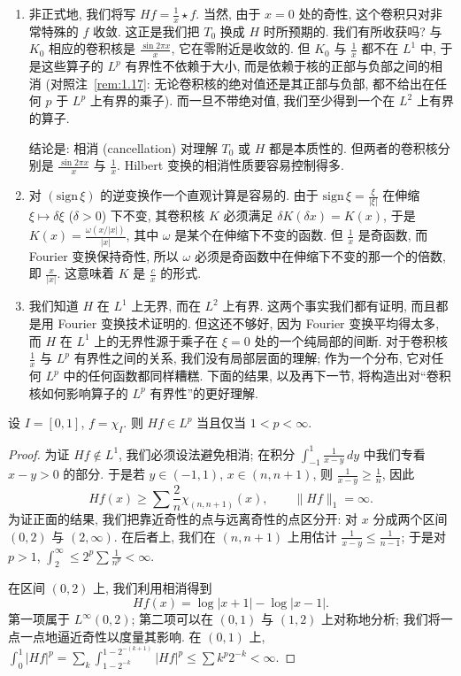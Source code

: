 \begin{remark}\label{rem:2.15}
\begin{enumerate}[label=\alph*)]
\item 非正式地, 我们将写 $Hf=\frac{1}{x}\star f$. 当然, 由于 $x=0$ 处的奇性, 这个卷积只对非常特殊的 $f$ 收敛. 这正是我们把 $T_0$ 换成 $H$ 时所预期的. 我们有所收获吗? 与 $K_0$ 相应的卷积核是 $\frac{\sin 2\pi x}{x}$, 它在零附近是收敛的. 但 $K_0$ 与 $\frac{1}{x}$ 都不在 $L^1$ 中, 于是这些算子的 $L^p$ 有界性不依赖于大小, 而是依赖于核的正部与负部之间的相消 (对照注~\ref{rem:1.17}: 无论卷积核的绝对值还是其正部与负部, 都不给出在任何 $p$ 于 $L^p$ 上有界的乘子). 而一旦不带绝对值, 我们至少得到一个在 $L^2$ 上有界的算子.

结论是: 相消 (cancellation) 对理解 $T_0$ 或 $H$ 都是本质性的. 但两者的卷积核分别是 $\frac{\sin 2\pi x}{x}$ 与 $\frac{1}{x}$. Hilbert 变换的相消性质要容易控制得多.
\item 对 $(\mathrm{sign}\,\xi)$ 的逆变换作一个直观计算是容易的. 由于 $\mathrm{sign}\,\xi=\frac{\xi}{|\xi|}$ 在伸缩 $\xi\mapsto\delta\xi$ ($\delta>0$) 下不变, 其卷积核 $K$ 必须满足 $\delta K(\delta x)=K(x)$, 于是 $K(x)=\frac{\omega(x/|x|)}{|x|}$, 其中 $\omega$ 是某个在伸缩下不变的函数. 但 $\frac{1}{x}$ 是奇函数, 而 Fourier 变换保持奇性, 所以 $\omega$ 必须是奇函数中在伸缩下不变的那一个的倍数, 即 $\frac{x}{|x|}$. 这意味着 $K$ 是 $\frac{c}{x}$ 的形式.
\item 我们知道 $H$ 在 $L^{1}$ 上无界, 而在 $L^{2}$ 上有界. 这两个事实我们都有证明, 而且都是用 Fourier 变换技术证明的. 但这还不够好, 因为 Fourier 变换平均得太多, 而 $H$ 在 $L^{1}$ 上的无界性源于乘子在 $\xi=0$ 处的一个纯局部的间断. 对于卷积核 $\frac{1}{x}$ 与 $L^p$ 有界性之间的关系, 我们没有局部层面的理解; 作为一个分布, 它对任何 $L^p$ 中的任何函数都同样糟糕. 下面的结果, 以及再下一节, 将构造出对``卷积核如何影响算子的 $L^p$ 有界性''的更好理解.
\end{enumerate}
\end{remark}

\begin{lemma}\label{lem:2.16}
设 $I=[0,1]$, $f=\chi_I$. 则 $Hf\in L^p$ 当且仅当 $1<p<\infty$.
\end{lemma}

\begin{proof}
为证 $Hf\notin L^{1}$, 我们必须设法避免相消; 在积分 $\int_{-1}^{1}\frac{1}{x-y}\,dy$ 中我们专看 $x-y>0$ 的部分. 于是若 $y\in(-1,1)$, $x\in(n,n+1)$, 则 $\frac{1}{x-y}\geq\frac{1}{n}$, 因此
\[
Hf(x)\geq\sum\frac{2}{n}\chi_{(n,n+1)}(x),\qquad \|Hf\|_{1}=\infty.
\]
为证正面的结果, 我们把靠近奇性的点与远离奇性的点区分开: 对 $x$ 分成两个区间 $(0,2)$ 与 $(2,\infty)$. 在后者上, 我们在 $(n,n+1)$ 上用估计 $\frac{1}{x-y}\leq\frac{1}{n-1}$; 于是对 $p>1$, $\int_{2}^{\infty}\leq 2^{p}\sum\frac{1}{n^{p}}<\infty$.

在区间 $(0,2)$ 上, 我们利用相消得到
\[
Hf(x)=\log|x+1|-\log|x-1|.
\]
第一项属于 $L^\infty(0,2)$; 第二项可以在 $(0,1)$ 与 $(1,2)$ 上对称地分析; 我们将一点一点地逼近奇性以度量其影响. 在 $(0,1)$ 上,
$\int_0^1|Hf|^p=\sum_k\int_{1-2^{-k}}^{1-2^{-(k+1)}}|Hf|^p\leq\sum k^{p}2^{-k}<\infty$.
\end{proof}

